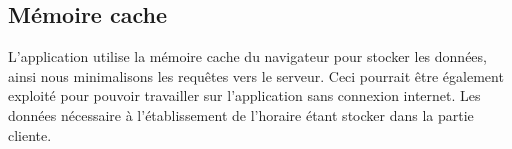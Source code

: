 \subsection{Mémoire cache}
L'application utilise la mémoire cache du navigateur pour stocker les données, ainsi nous minimalisons les requêtes vers le serveur. Ceci pourrait être également exploité pour pouvoir travailler sur l'application sans connexion internet. Les données nécessaire à l'établissement de l'horaire étant stocker dans la partie cliente.
